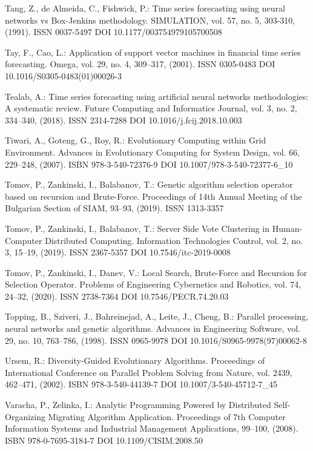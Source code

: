 \begin{thebibliography}{99.}
 Tang, Z., de Almeida, C., Fishwick, P.: Time series forecasting using neural networks vs Box-Jenkins methodology. SIMULATION, vol. 57, no. 5, 303-310, (1991). ISSN 0037-5497 DOI 10.1177/003754979105700508

 Tay, F., Cao, L.: Application of support vector machines in financial time series forecasting. Omega, vol. 29, no. 4, 309--317, (2001). ISSN 0305-0483 DOI 10.1016/S0305-0483(01)00026-3

 Tealab, A.: Time series forecasting using artificial neural networks methodologies: A systematic review. Future Computing and Informatics Journal, vol. 3, no. 2, 334--340, (2018). ISSN 2314-7288 DOI 10.1016/j.fcij.2018.10.003

 Tiwari, A., Goteng, G., Roy, R.: Evolutionary Computing within Grid Environment. Advances in Evolutionary Computing for System Design, vol. 66, 229--248, (2007). ISBN 978-3-540-72376-9 DOI 10.1007/978-3-540-72377-6\_10

 Tomov, P., Zankinski, I., Balabanov, T.: Genetic algorithm selection operator based on recursion and Brute-Force. Proceedings of 14th Annual Meeting of the Bulgarian Section of SIAM, 93--93, (2019). ISSN 1313-3357

 Tomov, P., Zankinski, I., Balabanov, T.: Server Side Vote Clustering in Human-Computer Distributed Computing. Information Technologies Control, vol. 2, no. 3, 15--19, (2019). ISSN 2367-5357 DOI 10.7546/itc-2019-0008

 Tomov, P., Zankinski, I., Danev, V.: Local Search, Brute-Force and Recursion for Selection Operator. Problems of Engineering Cybernetics and Robotics, vol. 74, 24--32, (2020). ISSN 2738-7364 DOI 10.7546/PECR.74.20.03

 Topping, B., Sziveri, J., Bahreinejad, A., Leite, J., Cheng, B.: Parallel processing, neural networks and genetic algorithms. Advances in Engineering Software, vol. 29, no. 10, 763--786, (1998). ISSN 0965-9978 DOI 10.1016/S0965-9978(97)00062-8

 Ursem, R.: Diversity-Guided Evolutionary Algorithms. Proceedings of International Conference on Parallel Problem Solving from Nature, vol. 2439, 462--471, (2002). ISBN 978-3-540-44139-7 DOI 10.1007/3-540-45712-7\_45

 Varacha, P., Zelinka, I.: Analytic Programming Powered by Distributed Self-Organizing Migrating Algorithm Application. Proceedings of 7th Computer Information Systems and Industrial Management Applications, 99--100, (2008). ISBN 978-0-7695-3184-7 DOI 10.1109/CISIM.2008.50


\end{thebibliography}
